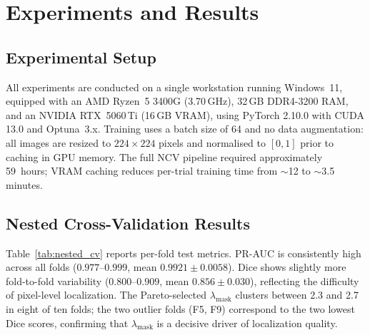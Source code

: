 
\section{Experiments and Results}
\label{sec:experiments}

\subsection{Experimental Setup}
\label{subsec:setup}

All experiments are conducted on a single workstation running Windows~11,
equipped with an AMD Ryzen~5 3400G (3.70\,GHz), 32\,GB DDR4-3200 RAM, and an NVIDIA
RTX~5060\,Ti (16\,GB VRAM), using PyTorch 2.10.0 with CUDA 13.0 and
Optuna~3.x. Training uses a batch size of 64 and no data augmentation:
all images are resized to $224\!\times\!224$ pixels and normalised to
$[0,1]$ prior to caching in GPU memory. The full NCV pipeline required
approximately 59~hours; VRAM caching reduces per-trial training time from
$\sim$12 to $\sim$3.5 minutes.

\subsection{Nested Cross-Validation Results}
\label{subsec:ncv_results}

Table~\ref{tab:nested_cv} reports per-fold test metrics. PR-AUC is
consistently high across all folds ($0.977$--$0.999$, mean $0.9921 \pm
0.0058$). Dice shows slightly more fold-to-fold variability ($0.800$--$0.909$,
mean $0.856 \pm 0.030$), reflecting the difficulty of pixel-level localization.
The Pareto-selected $\lambda_{\text{mask}}$ clusters between 2.3 and 2.7 in
eight of ten folds; the two outlier folds (F5, F9) correspond to the two lowest
Dice scores, confirming that $\lambda_{\text{mask}}$ is a decisive driver of
localization quality.

